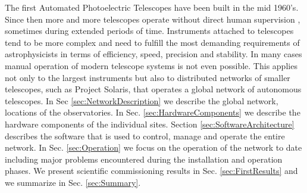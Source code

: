 
The first Automated Photoelectric Telescopes have been built in the mid 1960's. Since then more and more telescopes operate without direct human supervision \citep{Castro2010}, sometimes during extended periods of time. Instruments attached to telescopes tend to be more complex and need to fulfill the most demanding requirements of astrophysicists in terms of efficiency, speed, precision and stability. In many cases manual operation of modern telescope systems is not even possible. This applies not only to the largest instruments but also to distributed networks of smaller telescopes, such as Project Solaris, that operates a global network of autonomous telescopes. In Sec \ref{sec:NetworkDescription} we describe the global network, locations of the observatories. In Sec. \ref{sec:HardwareComponents} we describe the hardware components of the individual sites. Section \ref{sec:SoftwareArchitecture} describes the software that is used to control, manage and operate the entire network. In Sec. \ref{sec:Operation} we focus on the operation of the network to date including major problems encountered during the installation and operation phases. We present scientific commissioning results in Sec. \ref{sec:FirstResults} and we summarize in Sec. \ref{sec:Summary}. 

